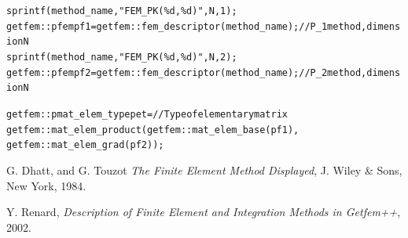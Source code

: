 \documentclass[11pt,a4paper]{article}
\begin{document}
\begin{alltt}

  sprintf(method\_name, "FEM\_PK(\%d, \%d)", N, 1);
  getfem::pfem pf1 = getfem::fem\_descriptor(method\_name); // P_1 method, dimension N
  sprintf(method\_name, "FEM\_PK(\%d, \%d)", N, 2);
  getfem::pfem pf2 = getfem::fem\_descriptor(method\_name); // P_2 method, dimension N  

  getfem::pmat_elem_type pet = // Type of elementary matrix
     getfem::mat_elem_product(getfem::mat_elem_base(pf1),
                              getfem::mat_elem_grad(pf2));
                              
\end{alltt}


\begin{thebibliography}{99}
% 
% 
% 
  G. {\sc Dhatt, and  G. Touzot}
  {\it The Finite Element Method Displayed}, 
 J. Wiley \& Sons,  New York, 1984.

  Y. {\sc Renard},
  {\it Description of Finite Element and Integration Methods in {\sc Getfem++}}, 2002.


\end{thebibliography}
\end{document}
